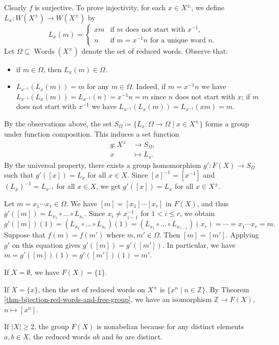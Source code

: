 \begin{sketch}
	Clearly $f$ is surjective. To prove injectivity, for each $x \in X^{\pm}$, we define $L_x:W(X^\pm) \to W(X^\pm)$ by
	\begin{equation*}
		L_x(m) = \begin{cases}
			xm &\text{if $m$ does not start with $x^{-1}$},
			\\
			n & \text{if $m = x^{-1}n$ for a unique word $n$}.
		\end{cases}
	\end{equation*}  
	Let  $\Omega \subseteq \operatorname{Words}(X^{\pm})$ denote the  set of reduced words. Observe that:
	\begin{itemize}
		\item if $m\in \Omega$, then $L_x(m)\in \Omega$.
		\item $L_{x^{-1}}(L_x(m)) = m$ for any $m\in\Omega$. Indeed, if $m = x^{-1}n$ we have $L_{x^{-1}}(L_x(m)) = L_{x^{-1}}(n) = x^{-1}n = m$ since $n$ does not start with $x$; if $m$ does not start with $x^{-1}$ we have $L_{x^{-1}}(L_x(m)) = L_{x^{-1}}(xm) = m$.
	\end{itemize}    
	By the observations above, the set $S_\Omega\coloneq\{L_x:\Omega \to \Omega\mid x\in X^\pm\}$ forms a group under function composition. This induces a set function
	\begin{align*}
		g:X^{\pm} &\to S_\Omega,
		\\
		x & \mapsto L_x.
	\end{align*}
	By the universal property, there exists a group homomorphism $g': F(X) \to S_{\Omega}$ such that $g'([x])=L_x$ for all $x \in X$. Since $[x]^{-1} = [x^{-1}]$ and $(L_x)^{-1} = L_{x^{-1}}$ for all $x\in X$, we get $g'([x])=L_x$ for all $x \in X^\pm$.
	
	Let $m = x_1 \cdots x_r \in \Omega$. We have $[m] = [x_1] \cdots [x_r]$ in $F(X)$, and thus $g'([m]) = L_{x_1} \circ \dots \circ L_{x_r}$. Since  $x_i \neq x_{i-1}^{-1}$ for $1 < i \le r$, we obtain
	\begin{equation*}
		g'([m])(1) = (L_{x_1} \circ \dots \circ L_{x_r})(1) = (L_{x_1} \circ \dots \circ L_{x_{r-1}})(x_r) = \cdots = x_1 \cdots x_r = m.
	\end{equation*}
	Suppose that $f(m) = f(m')$ where $m,m'\in\Omega$. Then $[m] = [m']$. Applying $g'$ on this equation gives $g'([m]) = g'([m'])$. In particular, we have $m = g'([m])(1) = g'([m'])(1) = m'$.  
\end{sketch}
\begin{example}
	If $X = \emptyset$, we have $F(X) = \{1\}$.
	
	If $X = \{x\}$, then the set of reduced words on $X^{\pm}$ is $\{x^n\mid n\in\mathbb{Z}\}$. By Theorem \ref{thm-bijection-red-words-and-free-group}, we have an isomorphism $\mathbb{Z}\to F(X)$, $n\mapsto [x^n]$.
	
	If $|X|\geq 2$, the group $F(X)$ is nonabelian because for any distinct elements $a,b\in X$, the reduced words $ab$ and $ba$ are distinct.
\end{example}


